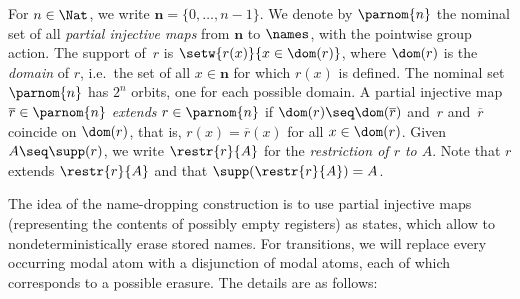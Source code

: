 \documentclass[10pt, final, conference, a4paper, twocolumn]{IEEEtran}
\begin{document}
\begin{defn}\label{defn:dollar}
  For $n\in\Nat$, we write $\mathbf{n}=\{0,\dots,n-1\}$. We denote by
  $\parnom{n}$ the nominal set of all \emph{partial injective maps}
  from $\mathbf{n}$ to $\names$, with the pointwise group action.  The
  support of~$r$ is $\setw{r(x)}{x \in \dom(r)}$, where $\dom(r)$ is
  the \emph{domain} of $r$, i.e.~the set of all $x \in \mathbf{n}$ for
  which $r(x)$ is defined. The nominal set
  $\parnom{n}$ has $2^{n}$ orbits, one for each possible
  domain. A partial injective map
  $\overline{r} \in \parnom{n}$ \emph{extends} $r \in \parnom{n}$ if
  $\dom(r) \seq \dom(\overline{r})$ and~$r$ and~$\overline{r}$
  coincide on $\dom(r)$, that is, $r(x) = \overline{r}(x)$ for all
  $x \in \dom(r)$.  Given $A \seq \supp(r)$, we write $\restr{r}{A}$
  for the \emph{restriction of $r$ to $A$}. Note that $r$ extends
  $\restr{r}{A}$ and that $\supp(\restr{r}{A}) = A$. 
\end{defn}

The idea of the name-dropping construction is to use partial injective maps (representing the contents of possibly empty registers) as states, which allow to nondeterministically erase stored names.
For transitions, we will replace every occurring modal atom with a disjunction of modal atoms, each of which corresponds to a possible erasure. The details are as follows:
\end{document}
